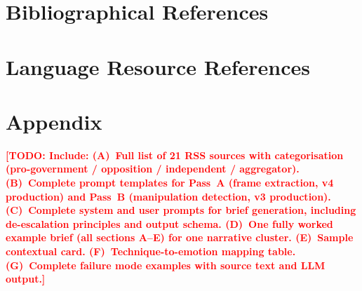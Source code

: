 \documentclass[10pt, a4paper]{article}
\newcommand{\todo}[1]{\textbf{\textcolor{red}{[TODO: #1]}}}
\begin{document}
\section{Bibliographical References}\label{sec:reference}




\section{Language Resource References}
\label{lr:ref}

\appendix
\section{Appendix}
\label{sec:appendix}

\todo{Include: (A)~Full list of 21 RSS sources with categorisation (pro-government / opposition / independent / aggregator). (B)~Complete prompt templates for Pass~A (frame extraction, v4 production) and Pass~B (manipulation detection, v3 production). (C)~Complete system and user prompts for brief generation, including de-escalation principles and output schema. (D)~One fully worked example brief (all sections A--E) for one narrative cluster. (E)~Sample contextual card. (F)~Technique-to-emotion mapping table. (G)~Complete failure mode examples with source text and LLM output.}
\end{document}
